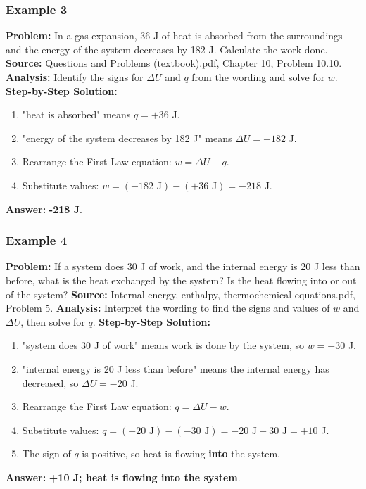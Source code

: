 \documentclass{article}
\begin{document}
\subsubsection{Example 3}
\textbf{Problem:} In a gas expansion, 36 J of heat is absorbed from the surroundings and the energy of the system decreases by 182 J. Calculate the work done.
\textbf{Source:} Questions and Problems (textbook).pdf, Chapter 10, Problem 10.10.
\textbf{Analysis:} Identify the signs for $\Delta U$ and $q$ from the wording and solve for $w$.
\textbf{Step-by-Step Solution:}
\begin{enumerate}
    \item "heat is absorbed" means $q = +36$ J.
    \item "energy of the system decreases by 182 J" means $\Delta U = -182$ J.
    \item Rearrange the First Law equation: $w = \Delta U - q$.
    \item Substitute values: $w = (-182 \text{ J}) - (+36 \text{ J}) = -218$ J.
\end{enumerate}
\textbf{Answer:} \textbf{-218 J}.

\subsubsection{Example 4}
\textbf{Problem:} If a system does 30 J of work, and the internal energy is 20 J less than before, what is the heat exchanged by the system? Is the heat flowing into or out of the system?
\textbf{Source:} Internal energy, enthalpy, thermochemical equations.pdf, Problem 5.
\textbf{Analysis:} Interpret the wording to find the signs and values of $w$ and $\Delta U$, then solve for $q$.
\textbf{Step-by-Step Solution:}
\begin{enumerate}
    \item "system does 30 J of work" means work is done by the system, so $w = -30$ J.
    \item "internal energy is 20 J less than before" means the internal energy has decreased, so $\Delta U = -20$ J.
    \item Rearrange the First Law equation: $q = \Delta U - w$.
    \item Substitute values: $q = (-20 \text{ J}) - (-30 \text{ J}) = -20 \text{ J} + 30 \text{ J} = +10$ J.
    \item The sign of $q$ is positive, so heat is flowing \textbf{into} the system.
\end{enumerate}
\textbf{Answer:} \textbf{+10 J; heat is flowing into the system}.
\end{document}
